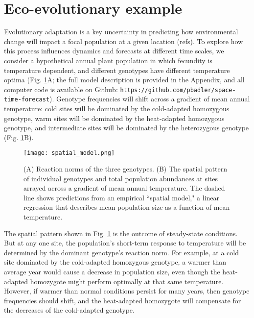 \documentclass[11pt]{article}
\begin{document}
\section*{Eco-evolutionary example}

Evolutionary adaptation is a key uncertainty in predicting how environmental change will impact a focal population at a given location (refs). To explore how this process influences dynamics and forecasts at different time scales, we consider a hypothetical annual plant population in which fecundity is temperature dependent, and different genotypes have different temperature optima (Fig. \ref{fig:spatial_model}A; the full model description is provided in the Appendix, and all computer code is available on Github: \texttt{https://github.com/pbadler/space-time-forecast}). Genotype frequencies will shift across a gradient of mean annual temperature: cold sites will be dominated by the cold-adapted homozygous genotype, warm sites will be dominated by the heat-adapted homozygous genotype, and intermediate sites will be dominated by the heterozygous genotype (Fig. \ref{fig:spatial_model}B).

\begin{figure}[tbp]
\centering
\texttt{[image: spatial\_model.png]}
\caption{(A) Reaction norms of the three genotypes. (B) The spatial pattern of individual genotypes and total population abundances at sites arrayed across a gradient of mean annual temperature. The dashed line shows predictions from an empirical ``spatial model," a linear regression that describes mean population size as a function of mean temperature. }
\label{fig:spatial_model}
\end{figure}

The spatial pattern shown in Fig. \ref{fig:spatial_model} is the outcome of steady-state conditions. But at any one site, the population's short-term response to temperature will be determined by the dominant genotype's reaction norm. For example, at a cold site dominated by the cold-adapted homozygous genotype, a warmer than average year would cause a decrease in population size, even though the heat-adapted homozygote might perform optimally at that same temperature. However, if warmer than normal conditions persist for many years, then genotype frequencies should shift, and the heat-adapted homozygote will compensate for the decreases of the cold-adapted genotype. 
\end{document}
